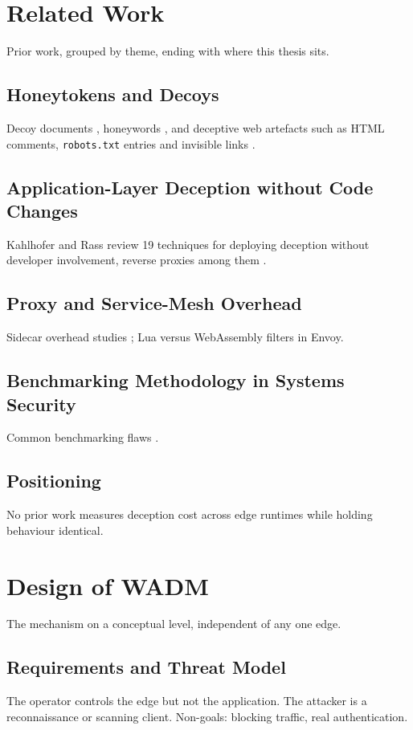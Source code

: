 \documentclass{rptuma}
\begin{document}
\chapter{Related Work}
\label{chap:A.related}
Prior work, grouped by theme, ending with where this thesis sits.

\section{Honeytokens and Decoys}
Decoy documents \cite{bowen2009baiting}, honeywords \cite{juels2013honeywords}, and deceptive web
artefacts such as HTML comments, \texttt{robots.txt} entries and invisible links
\cite{virvilis2014changing}.

\section{Application-Layer Deception without Code Changes}
Kahlhofer and Rass review 19 techniques for deploying deception without developer involvement,
reverse proxies among them \cite{kahlhofer2024application}.

\section{Proxy and Service-Mesh Overhead}
Sidecar overhead studies \cite{zhu2022dissecting}; Lua versus WebAssembly filters in Envoy.

\section{Benchmarking Methodology in Systems Security}
Common benchmarking flaws \cite{vanderkouwe2019sok,heiser_crimes}.

\section{Positioning}
No prior work measures deception cost across edge runtimes while holding behaviour identical.

\chapter{Design of WADM}
The mechanism on a conceptual level, independent of any one edge.

\section{Requirements and Threat Model}
The operator controls the edge but not the application. The attacker is a reconnaissance or
scanning client. Non-goals: blocking traffic, real authentication.
\end{document}
